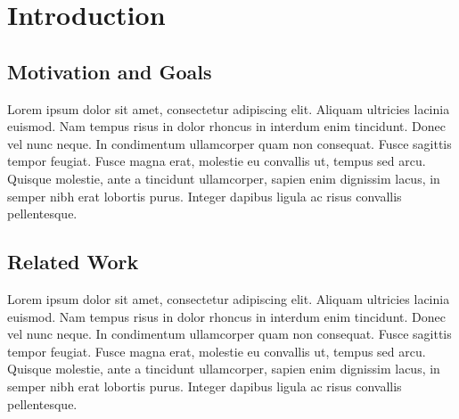 

\chapter{Introduction} %

\label{introduction} %



\section{Motivation and Goals}

Lorem ipsum dolor sit amet, consectetur adipiscing elit. Aliquam ultricies lacinia euismod. Nam tempus risus in dolor
rhoncus in interdum enim tincidunt. Donec vel nunc neque. In condimentum ullamcorper quam non consequat. Fusce
sagittis tempor feugiat. Fusce magna erat, molestie eu convallis ut, tempus sed arcu. Quisque molestie, ante a
tincidunt ullamcorper, sapien enim dignissim lacus, in semper nibh erat lobortis purus. Integer dapibus ligula ac
risus convallis pellentesque.


\section{Related Work}

Lorem ipsum dolor sit amet, consectetur adipiscing elit. Aliquam ultricies lacinia euismod. Nam tempus risus in dolor
rhoncus in interdum enim tincidunt. Donec vel nunc neque. In condimentum ullamcorper quam non consequat. Fusce
sagittis tempor feugiat. Fusce magna erat, molestie eu convallis ut, tempus sed arcu. Quisque molestie, ante a
tincidunt ullamcorper, sapien enim dignissim lacus, in semper nibh erat lobortis purus. Integer dapibus ligula ac
risus convallis pellentesque.

